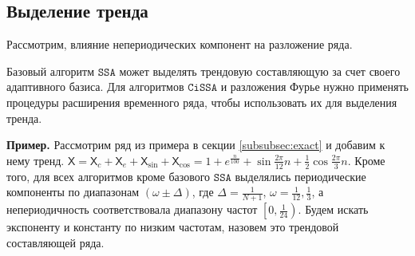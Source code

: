 \documentclass[12pt, specialist, subf
]{disser}
\theoremstyle{definition}
\newcommand{\SSA}{\texttt{SSA}}
\newcommand{\CISSA}{\texttt{CiSSA}}
\newcommand{\TS}{\mathsf{X}}
\begin{document}
%


\subsection{Выделение тренда}

\label{subsubsec:trend}

Рассмотрим, влияние непериодических компонент на разложение ряда.

Базовый алгоритм $\SSA$ может выделять трендовую составляющую за счет своего адаптивного базиса. Для алгоритмов $\CISSA$ и разложения Фурье нужно применять процедуры расширения временного ряда, чтобы использовать их для выделения тренда.

\textbf{\large{Пример.}} Рассмотрим ряд из примера в секции \ref{subsubsec:exact} и добавим к нему тренд. $\TS = \TS_{c} + \TS_e + \TS_{\sin} + \TS_{\cos} = 1 + e^{\frac{n}{100}} + \sin{\frac{2\pi}{12}n} + \frac{1}{2}\cos{\frac{2\pi}{3}n}$.
Кроме того, для всех алгоритмов кроме базового $\SSA$ выделялись периодические компоненты по диапазонам $\left(\omega \pm \Delta \right)$, где $\Delta = \frac{1}{N+1}$, $\omega = \frac{1}{12}, \frac{1}{3}$, а непериодичность соответствовала диапазону частот $\left[0, \frac{1}{24} \right)$.
Будем искать экспоненту и константу по низким частотам, назовем это трендовой составляющей ряда.
\end{document}
